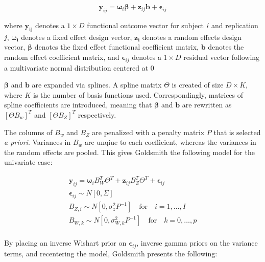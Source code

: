 \documentclass[AMA,Times1COL]{WileyNJDv5} %
\begin{document}
\begin{equation}
    \boldsymbol{y}_{ij} = \boldsymbol{\omega}_i\boldsymbol{\beta} + \boldsymbol{z}_{ij}\boldsymbol{b} + \boldsymbol{\epsilon}_{ij}
\end{equation}

where \(\boldsymbol{y_{ij}}\) denotes a \(1 \times D\) functional outcome vector for subject \(\emph{i}\) and replication \(\emph{j}\), \(\boldsymbol{\omega_i}\) denotes a fixed effect design vector, \(\boldsymbol{z_i}\) denotes a random effects design vector, \(\boldsymbol{\beta}\) denotes the fixed effect functional coefficient matrix, \(\boldsymbol{b}\) denotes the random effect coefficient matrix, and  \(\boldsymbol{\epsilon}_{ij}\) denotes a \(1 \times D \) residual vector following a multivariate normal distribution centered at 0\cite{goldsmith_assessing_2016}

\(\boldsymbol{\beta}\) and \(\boldsymbol{b}\) are expanded via splines.  A spline matrix \(\Theta\) is created of size \(D \times K\), where \(K\) is the number of basis functions used.  Correspondingly, matrices of spline coefficients are introduced, meaning that \(\boldsymbol{\beta}\) and \(\boldsymbol{b}\) are rewritten as \(\left[\Theta B_w\right]^T\) and \(\left[\Theta B_Z\right]^T\) respectively.

The columns of \(B_w\) and \(B_Z\) are penalized with a penalty matrix \(P\) that is selected \emph{a priori}.  Variances in \(B_w\) are unqiue to each coefficient, whereas the variances in the random effects are pooled.  This gives Goldsmith the following model for the univariate case:

\begin{equation}
    \begin{split}
        \boldsymbol{y}_{ij} = \boldsymbol{\omega}_iB_W^T\Theta^T + \boldsymbol{z}_{ij}B_Z^T\Theta^T + \boldsymbol{\epsilon}_{ij}\\
        \boldsymbol{\epsilon}_{ij} \sim N[0, \Sigma]\\
        B_{Z,i} \sim N[0, \sigma_z^2P^{-1}]\quad \text{for} \quad i = 1,\dots, I\\
        B_{W, k} \sim N[0, \sigma_{W,k}^2P^{-1}]\quad \text{for} \quad k = 0,\dots, p\\
    \end{split}
\end{equation}

By placing an inverse Wishart prior on \(\boldsymbol{\epsilon}_{ij}\),  inverse gamma priors on the variance terms, and recentering the model, Goldsmith presents the following:
\end{document}
